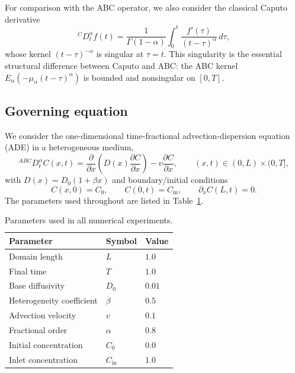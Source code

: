 \documentclass[11pt]{article}
\begin{document}
For comparison with the ABC operator, we also consider the classical Caputo derivative
\begin{equation}
{}^{C}D_t^\alpha f(t)
=
\frac{1}{\Gamma(1-\alpha)}
\int_0^t \frac{f'(\tau)}{(t-\tau)^\alpha}\,d\tau,
\label{eq:caputo}
\end{equation}
whose kernel \((t-\tau)^{-\alpha}\) is singular at \(\tau = t\). This singularity is the essential structural difference between Caputo and ABC: the ABC kernel \(E_\alpha(-\mu_\alpha(t-\tau)^\alpha)\) is bounded and nonsingular on \([0,T]\).

\subsection{Governing equation}
\label{sec:gov}

We consider the one-dimensional time-fractional advection-dispersion equation (ADE) in a heterogeneous medium,
\begin{equation}
{}^{ABC}D_t^\alpha C(x,t)
=
\frac{\partial}{\partial x}\!\left(D(x)\frac{\partial C}{\partial x}\right)
-
v \frac{\partial C}{\partial x},
\qquad (x,t)\in(0,L)\times(0,T],
\label{eq:gov}
\end{equation}
with \(D(x) = D_0(1+\beta x)\) and boundary/initial conditions
\begin{equation}
C(x,0) = C_0, \qquad C(0,t) = C_{\mathrm{in}}, \qquad \partial_x C(L,t) = 0.
\end{equation}
The parameters used throughout are listed in Table~\ref{tab:params}.

\begin{table}[h]
\centering
\caption{Parameters used in all numerical experiments.}
\label{tab:params}
\begin{tabular}{lll}
\toprule
Parameter & Symbol & Value \\
\midrule
Domain length & \(L\) & \(1.0\) \\
Final time & \(T\) & \(1.0\) \\
Base diffusivity & \(D_0\) & \(0.01\) \\
Heterogeneity coefficient & \(\beta\) & \(0.5\) \\
Advection velocity & \(v\) & \(0.1\) \\
Fractional order & \(\alpha\) & \(0.8\) \\
Initial concentration & \(C_0\) & \(0.0\) \\
Inlet concentration & \(C_{\mathrm{in}}\) & \(1.0\) \\
\bottomrule
\end{tabular}
\end{table}
\end{document}
